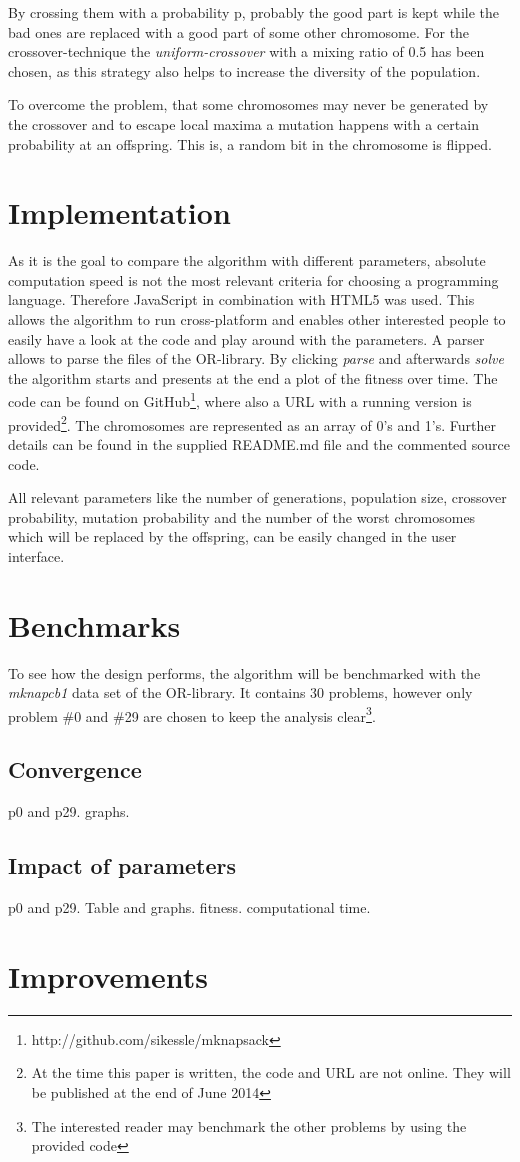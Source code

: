 \documentclass[a4paper]{article}
\begin{document}
By crossing them with a probability p, probably the good part is kept while the bad ones are replaced with a good part of some other chromosome. For the crossover-technique the \emph{uniform-crossover} with a mixing ratio of 0.5 has been chosen, as this strategy also helps to increase the diversity of the population. 

To overcome the problem, that some chromosomes may never be generated by the crossover and to escape local maxima a mutation happens with a certain probability at an offspring. This is, a random bit in the chromosome is flipped.

\section{Implementation}

As it is the goal to compare the algorithm with different parameters, absolute computation speed is not the most relevant criteria  for choosing a programming language. Therefore JavaScript in combination with HTML5 was used. This allows the algorithm to run cross-platform and enables other interested people to easily have a look at the code and play around with the parameters. A parser allows to parse the files of the OR-library. By clicking \emph{parse} and afterwards \emph{solve} the algorithm starts and presents at the end a plot of the fitness over time. The code can be found on GitHub\footnote{http://github.com/sikessle/mknapsack}, where also a URL with a running version is provided\footnote{At the time this paper is written, the code and URL are not online. They will be published at the end of June 2014}. The chromosomes are represented as an array of 0's and 1's. Further details can be found in the supplied README.md file and the commented source code.

All relevant parameters like the number of generations, population size, crossover probability, mutation probability and the number of the worst chromosomes which will be replaced by the offspring, can be easily changed in the user interface. 

\section{Benchmarks}

To see how the design performs, the algorithm will be benchmarked with the \emph{mknapcb1} data set of the OR-library. It contains 30 problems, however only problem \#0 and \#29 are chosen to keep the analysis clear\footnote{The interested reader may benchmark the other problems by using the provided code}.

\subsection{Convergence}

p0 and p29. graphs. 

\subsection{Impact of parameters}

p0 and p29. Table and graphs. fitness. computational time.



\section{Improvements}
\end{document}
